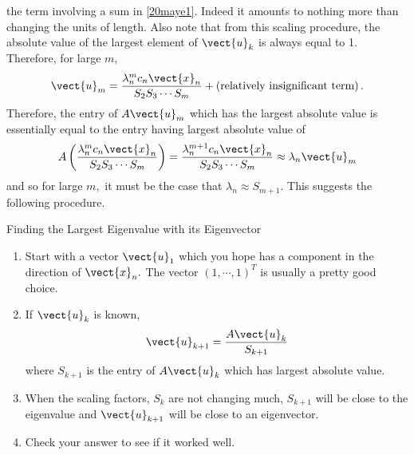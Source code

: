 the term involving a sum in \ref{20maye1}. Indeed it amounts to nothing more
than changing the units of length. Also note that from this scaling
procedure, the absolute value of the largest element of $\vect{u}_{k}$ is
always equal to 1. Therefore, for large $m,$
\begin{equation*}
\vect{u}_{m}=\vspace{0.05in}\frac{\lambda _{n}^{m}c_{n}\vect{x}_{n}}{S_{2}S_{3}\cdots S_{m}}+\left( \text{relatively insignificant term}\right) .
\end{equation*}
Therefore, the entry of $A\vect{u}_{m}$ which has the largest absolute value
is essentially equal to the entry having largest absolute value of 
\begin{equation*}
A\left( \vspace{0.05in}\frac{\lambda _{n}^{m}c_{n}\vect{x}_{n}}{S_{2}S_{3}\cdots S_{m}}\right) =\vspace{0.05in}\frac{\lambda _{n}^{m+1}c_{n}
\vect{x}_{n}}{S_{2}S_{3}\cdots S_{m}}\approx \lambda _{n}\vect{u}_{m}
\end{equation*}%
and so for large $m,$ it must be the case that $\lambda _{n}\approx S_{m+1}.$
This suggests the following procedure.

\begin{procedure}{Finding the Largest Eigenvalue with its Eigenvector}
\begin{enumerate}
\item Start with a vector $\vect{u}_{1}$ which you hope has a component in
the direction of $\vect{x}_{n}.$ The vector $\left( 1,\cdots ,1\right) ^{T}$
is usually a pretty good choice.

\item If $\vect{u}_{k}$ is known, 
\begin{equation*}
\vect{u}_{k+1}=\frac{A\vect{u}_{k}}{S_{k+1}}
\end{equation*}
where $S_{k+1}$ is the entry of $A\vect{u}_{k}$ which has largest absolute
value.

\item When the scaling factors, $S_{k}$ are not changing much, $S_{k+1}$
will be close to the eigenvalue and $\vect{u}_{k+1}$ will be close to an
eigenvector.

\item Check your answer to see if it worked well.
\end{enumerate}
\end{procedure}

